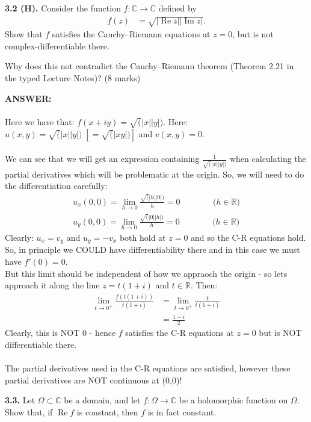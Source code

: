 \documentclass[12pt,a4paper]{article}
\begin{document}
\newpage
\noindent\textbf{3.2 (H).} Consider the function \(f:\mathbb{C}\to\mathbb{C}\) defined by
\begin{align*}
f(z)&=\sqrt{|\operatorname{Re}z||\operatorname{Im}z|}.
\end{align*}
Show that \(f\) satisfies the Cauchy--Riemann equations at \(z=0\), but is not complex-differentiable there.
\par
\noindent Why does this not contradict the Cauchy--Riemann theorem (Theorem 2.21 in the typed Lecture Notes)? \hfill (8 marks)

\vspace{1cm}

\textbf{ANSWER:}\\
\\
Here we have that: $f(x+iy) = \sqrt(|x||y|)$.  Here: $u(x,y)=\sqrt(|x||y|) \;\left[=\sqrt(|xy|)\right]$ and $v(x,y)=0$.\\
\\
We can see that we will get an expression containing $\frac{1}{\sqrt(|x||y|)}$ when calculating the partial derivatives which will be problematic at the origin.  So, we will need
to do the differentiation carefully:
\begin{align*}
    u_x(0,0) = \lim_{h \to 0} \frac{\sqrt(|h||0|)}{h} = 0 \;\;\;\;\;\;\;\;\;\;\;\;\;\; \text{($h \in \mathbb{R}$)}\\
    u_y(0,0) = \lim_{h \to 0} \frac{\sqrt(|0||h|)}{h} = 0 \;\;\;\;\;\;\;\;\;\;\;\;\;\; \text{($h \in \mathbb{R}$)}
\end{align*}
Clearly: $u_x=v_y$ and $u_y=-v_x$ both hold at $z=0$ and so the C-R equations hold. So, in principle we COULD have differentiability there and in this case we must
have $f'(0)=0$.\\
But this limit should be independent of how we appraoch the origin - so lets approach it along the line $z=t(1+i)$ and $t \in \mathbb{R}$. Then:
\begin{align*}
    \lim_{t \to 0^{+}}\frac{f(t(1+i))}{t(1+i)} &= \lim_{t \to 0^{+}}\frac{t}{t(1+i)} \\
    &= \frac{1-i}{2}
 \end{align*}
Clearly, this is NOT 0 - hence $f$ satisfies the C-R equations at $z=0$ but is NOT differentiable there.\\
\\
The partial derivatives used in the C-R equations are satisfied, however these partial derivatives are NOT continuous at (0,0)!

\newpage
\noindent\textbf{3.3.} Let \(\Omega\subset\mathbb{C}\) be a domain, and let \(f:\Omega\to\mathbb{C}\) be a holomorphic function on \(\Omega\). Show that, if \(\operatorname{Re}f\) is constant, then \(f\) is in fact constant.
\end{document}
